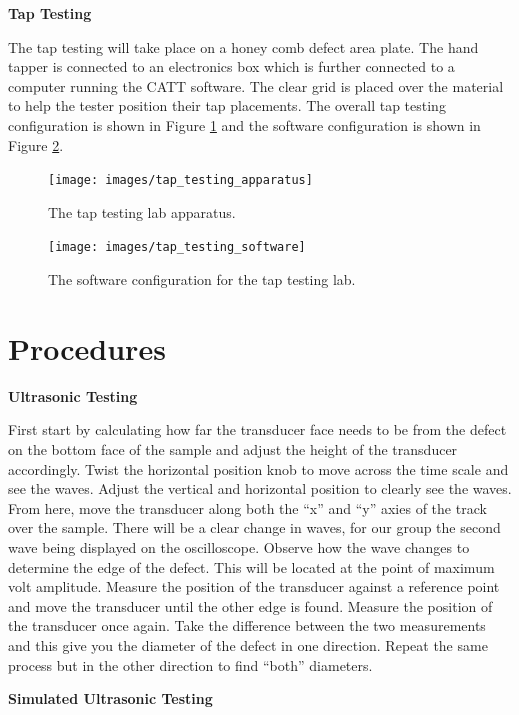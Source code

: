 \documentclass[12 pt]{report}
\begin{document}
\textbf{Tap Testing}

The tap testing will take place on a  honey comb defect area plate. The hand tapper is connected to an electronics box which is further connected to a computer running the CATT software. The clear grid is placed over the material to help the tester position their tap placements. The overall tap testing configuration is shown in Figure \ref{fig:tap_testing_apparatus} and the software configuration is shown in Figure \ref{fig:tap_testing_software}.

\begin{figure}[htbp]
	\centering
	\texttt{[image: images/tap\_testing\_apparatus]}
	\caption{The tap testing lab apparatus.}
	\label{fig:tap_testing_apparatus}
\end{figure}

\begin{figure}[htbp]
	\centering
	\texttt{[image: images/tap\_testing\_software]}
	\caption{The software configuration for the tap testing lab.}
	\label{fig:tap_testing_software}
\end{figure}

\section{Procedures} \label{procedures}
\textbf{Ultrasonic Testing}

First start by calculating how far the transducer face needs to be from the defect on the bottom face of the sample and adjust the height of the transducer accordingly. Twist the horizontal position knob to move across the time scale and see the waves. Adjust the vertical and horizontal position to clearly see the waves. From here, move the transducer along both the “x” and “y” axies of the track over the sample. There will be a clear change in waves, for our group the second wave being displayed on the oscilloscope. Observe how the wave changes to determine the edge of the defect. This will be located at the point of maximum volt amplitude. Measure the position of the transducer against a reference point and move the transducer until the other edge is found. Measure the position of the transducer once again. Take the difference between the two measurements and this give you the diameter of the defect in one direction. Repeat the same process but in the other direction to find “both” diameters.

\textbf{Simulated Ultrasonic Testing}
\end{document}
